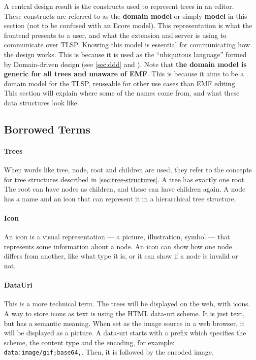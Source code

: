 A central design result is the constructs used to represent trees in an editor.
These constructs are referred to as the \textbf{domain model} or simply \textbf{model} in this section (not to be confused with an \acrshort{Ecore} model).
This representation is what the frontend presents to a user, and what the extension and server is using to communicate over \acrfull{TLSP}.
Knowing this model is essential for communicating how the design works.
This is because it is used as the ``ubiquitous language'' formed by Domain-driven design (see \cref{sec:ddd} and \cite{evansDomaindrivenDesignTackling2004}).
Note that \textbf{the domain model is generic for all trees and unaware of \acrshort{EMF}}.
This is because it aims to be a domain model for the \acrshort{TLSP}, reuseable for other use cases than \acrshort{EMF} editing.
This section will explain where some of the names come from, and what these data structures look like.\\

\subsection{Borrowed Terms}

\paragraph{Trees}
When words like tree, node, root and children are used, they refer to the concepts for tree structures described in \cref{sec:tree-structures}.
A tree has exactly one root.
The root can have nodes as children, and these can have children again.
A node has a name and an icon that can represent it in a hierarchical tree structure.

\paragraph{Icon}
An icon is a visual representation --- a picture, illustration, symbol --- that represents some information about a node.
An icon can show how one node differs from another, like what type it is, or it can show if a node is invalid or not.

\paragraph{DataUri}
This is a more technical term.
The trees will be displayed on the web, with icons.
A way to store icons as text is using the HTML data-uri scheme.
It is just text, but has a semantic meaning.
When set as the image source in a web browser, it will be displayed as a picture.
A data-uri starts with a prefix which specifies the scheme, the content type and the encoding, for example: \lstinline|data:image/gif;base64,|.
Then, it is followed by the encoded image.

